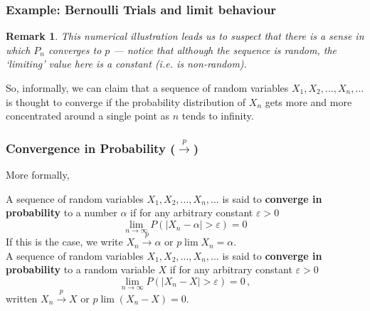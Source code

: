 \documentclass[notes=show,smaller,handout]{beamer}
\newtheorem{remark}{Remark}[section]
\renewcommand{\Pr}{P}
\begin{document}
\begin{frame}%

\frametitle{Example: Bernoulli Trials and limit behaviour}

\begin{remark}
This numerical illustration leads us to suspect that there is a sense in which ${P}_n$ converges to $p$ --- notice that although the sequence is random, the `limiting' value here is a constant (i.e. is non-random).
\end{remark}

\vspace{1.5cm}

So, informally, we can claim that a sequence of random variables $X_{1},X_{2},...,X_{n},...$ is thought to
converge if the probability distribution of $X_{n}$ gets more and more concentrated around a single point as $n$ tends to infinity.
\end{frame} 


\begin{frame}%

\frametitle{Convergence in Probability ($\overset{p}{\rightarrow }$)}

More formally,

\begin{definition}
A sequence of random variables $X_{1},X_{2},...,X_{n},...$ is said to \textbf{%
converge in probability} to a number $\alpha $ if for any arbitrary constant $\varepsilon >0$%
\begin{equation*}
\lim_{n\rightarrow \infty }\Pr \left( \left\vert X_{n}-\alpha \right\vert
>\varepsilon \right) =0
\end{equation*}
If this is the case, we write $X_{n}\overset{p}{\rightarrow }\alpha$ or $p\lim X_{n}=\alpha$. \\
\vspace{0.3cm} 
A sequence of random variables $X_{1},X_{2},...,X_{n},...$ is said to \textbf{%
converge in probability} to a random variable $X$ if for any arbitrary constant $\varepsilon >0$%
\begin{equation*}
\lim_{n\rightarrow \infty }\Pr \left( \left\vert X_{n}-X \right\vert
>\varepsilon \right) =0\,,
\end{equation*}
written $X_{n}\overset{p}{\rightarrow }X$ or $p\lim(X_{n}-X)=0$.
\end{definition}
\end{frame}%
\end{document}
